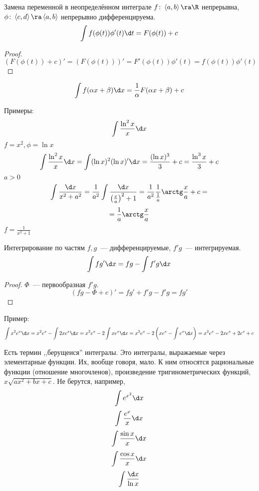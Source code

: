 \begin{theorem}{Замена переменной в неопределённом интеграле}
$f\colon \left<a, b\right> \ra \R$ непрерывна, $\phi\colon \left<c, d\right> \ra \left<a, b\right>$ непрерывно дифференцируема.
$$\int f(\phi(t)) \phi'(t) \d t = F(\phi(t)) + c$$
\end{theorem}
\begin{proof}
$$\left(F(\phi(t)) + c\right)' = (F(\phi(t)))' = F'(\phi(t)) \phi'(t) = f(\phi(t)) \phi'(t)$$
\end{proof}
\begin{conseq}
$$\int f(\alpha x + \beta) \d x = \frac1{\alpha}F(\alpha x + \beta) + c$$
\end{conseq}

Примеры:
$$\int \frac{\ln^2 x}{x}\d x$$
$f = x^2, \phi = \ln x$
$$\int \frac{\ln^2 x}{x} \d x = \int (\ln x)^2 (\ln x)' \d x = \frac{(\ln x)^3}3 + c = \frac{\ln^3 x}3 + c$$
$a>0$
$$\int \frac{\d x}{x^2 + a^2} = \frac1{a^2} \int \frac{\d x}{\left(\frac{x}a\right)^2 + 1} = \frac1{a^2} \frac1{\frac1a} \arctg \frac{x}a + c=$$
$$= \frac1a \arctg \frac{x}a$$
$f=\frac1{x^2+1}$

\begin{theorem}{Интегрирование по частям}
$f, g$~--- дифференцируемые, $f'g$~--- интегрируемая.
$$\int fg'\d x = fg - \int f'g \d x$$
\end{theorem}
\begin{proof}
$\Phi$~--- первообразная $f'g$.
$$(fg - \Phi + c)' = fg' + f'g - f'g = fg'$$
\end{proof}
Пример:
$$\int x^2 e^x \d x = x^2 e^x - \int 2x e^x \d x = x^2 e^x - 2 \int x e^x \d x = x^2 e^x - 2\left(x e^x - \int e^x \d x\right) = x^2 e^x - 2x e^x + 2e^x + c$$

Есть термин ,,берущеися'' интегралы. Это интегралы, выражаемые через элементарные функции. Их, вообще говоря, мало. К ним относятся рациональные функции (отношение многочленов), произведение тригинометрических функций, $x\sqrt{ax^2 + bx + c}$. Не берутся, например, 
$$\int e^{x^2} \d x$$
$$\int \frac{e^x}x \d x$$
$$\int \frac{\sin x}x \d x$$
$$\int \frac{\cos x}x\d x$$
$$\int \frac{\d x}{\ln x}$$
